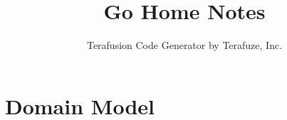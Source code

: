 \documentclass[10pt]{report}
\title{ Go Home Notes }
\author{Terafusion Code Generator by Terafuze, Inc.}
\begin{document}
\maketitle
\tableofcontents

\chapter{Domain Model}


\end{document}
